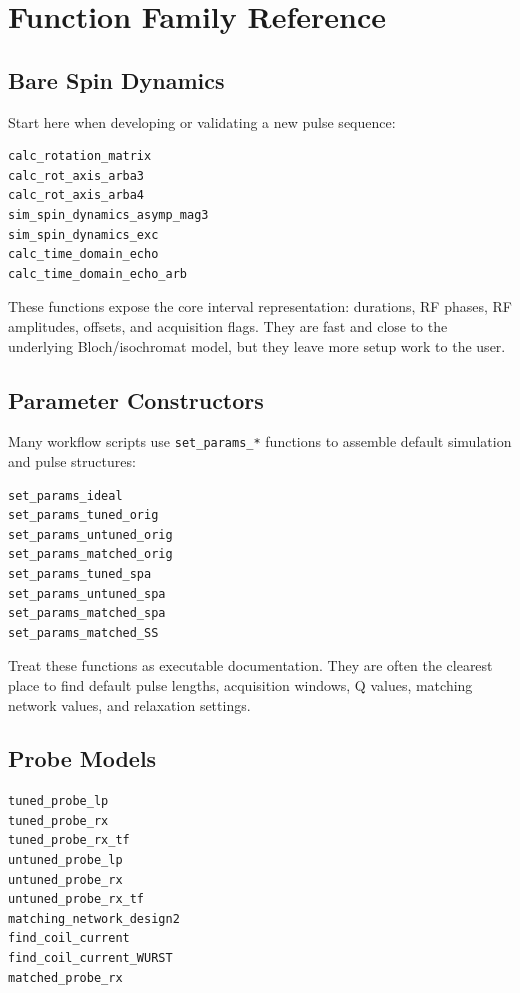 \documentclass[11pt,oneside]{report}
\newcommand{\code}[1]{\texttt{#1}}
\begin{document}
\chapter{Function Family Reference}

\section{Bare Spin Dynamics}

Start here when developing or validating a new pulse sequence:

\begin{lstlisting}
calc_rotation_matrix
calc_rot_axis_arba3
calc_rot_axis_arba4
sim_spin_dynamics_asymp_mag3
sim_spin_dynamics_exc
calc_time_domain_echo
calc_time_domain_echo_arb
\end{lstlisting}

These functions expose the core interval representation: durations, RF phases,
RF amplitudes, offsets, and acquisition flags. They are fast and close to the
underlying Bloch/isochromat model, but they leave more setup work to the user.

\section{Parameter Constructors}

Many workflow scripts use \code{set\_params\_*} functions to assemble default
simulation and pulse structures:

\begin{lstlisting}
set_params_ideal
set_params_tuned_orig
set_params_untuned_orig
set_params_matched_orig
set_params_tuned_spa
set_params_untuned_spa
set_params_matched_spa
set_params_matched_SS
\end{lstlisting}

Treat these functions as executable documentation. They are often the clearest
place to find default pulse lengths, acquisition windows, Q values, matching
network values, and relaxation settings.

\section{Probe Models}

\begin{lstlisting}
tuned_probe_lp
tuned_probe_rx
tuned_probe_rx_tf
untuned_probe_lp
untuned_probe_rx
untuned_probe_rx_tf
matching_network_design2
find_coil_current
find_coil_current_WURST
matched_probe_rx
\end{lstlisting}
\end{document}

